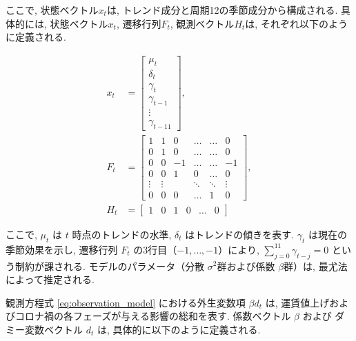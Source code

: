 \documentclass{bcsj}
\begin{document}
ここで, 状態ベクトル$x_t$は, トレンド成分と周期12の季節成分から構成される. 
具体的には, 状態ベクトル$x_t$, 遷移行列$F_t$, 観測ベクトル$H_t$は, それぞれ以下のように定義される. 

\begin{align}
    x_t &= 
    \begin{bmatrix}
        \mu_t \\      %
        \delta_t \\    %
        \gamma_t \\    %
        \gamma_{t-1} \\ %
        \vdots \\
        \gamma_{t-11}  %
    \end{bmatrix}
    , \\ %
    F_t &= 
    \begin{bmatrix}
        1 & 1 & 0 & \dots & \dots & 0 \\
        0 & 1 & 0 & \dots & \dots & 0 \\
        0 & 0 & -1 & \dots & \dots & -1 \\
        0 & 0 & 1 & 0 & \dots & 0 \\
        \vdots & \vdots & & \ddots & \ddots & \vdots \\
        0 & 0 & 0 & \dots & 1 & 0
    \end{bmatrix}
    , \\
    H_t &= 
    \begin{bmatrix}
        1 & 0 & 1 & 0 & \dots & 0
    \end{bmatrix}
\end{align}

ここで, $\mu_t$ は $t$ 時点のトレンドの水準, $\delta_t$ はトレンドの傾きを表す. 
$\gamma_t$ は現在の季節効果を示し, 遷移行列 $F_t$ の3行目（$-1, \dots, -1$）により, $\sum_{j=0}^{11} \gamma_{t-j} = 0$ という制約が課される. 
モデルのパラメータ（分散 $\sigma^2$群および係数 $\beta$群）は, 最尤法によって推定される. 

観測方程式 \eqref{eq:observation_model} における外生変数項 $\beta d_t$ は, 運賃値上げおよびコロナ禍の各フェーズが与える影響の総和を表す. 
係数ベクトル $\beta$ および ダミー変数ベクトル $d_t$ は, 具体的に以下のように定義される. 
\end{document}
